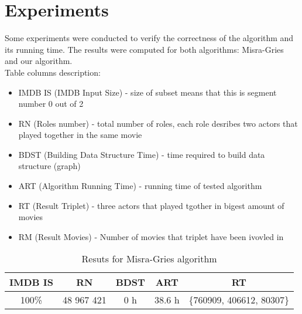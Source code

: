 \label{Experiments}
\section{Experiments}


Some experiments were conducted to verify the correctness of the algorithm and its running time. The results were computed for both algorithms: Misra-Gries and our algorithm.
\\

Table columns description:
 
\begin{itemize}
  \item IMDB IS (IMDB Input Size) - size of subset means that this is segment number 0 out of 2
  \item RN (Roles number) - total number of roles, each role desribes two actors that played together in the same movie
  \item BDST (Building Data Structure Time) - time required to build data structure (graph)
  \item ART (Algorithm Running Time) - running time of tested algorithm
  \item RT (Result Triplet) - three actors that played tgother in bigest amount of movies
  \item RM (Result Movies) - Number of movies that triplet have been ivovled in
\end{itemize}

\begin{table}[ht]
\caption{Resuts for Misra-Gries algorithm}
\centering
\begin{tabular}{c c c c c}
\hline\hline
IMDB IS&RN&BDST&ART&RT\\ [0.5ex]
\hline
100\%&48 967 421&0 h&38.6 h&\{760909, 406612, 80307\} \\
\hline
\end{tabular}
\label{resMisraGries}
\end{table}

